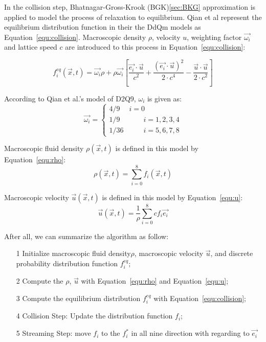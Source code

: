 In the collision step, Bhatnagar-Gross-Krook (BGK)\ref{sec:BKG} approximation is applied to model the process of relaxation to equilibrium. Qian et al represent the equilibrium distribution function in their the DdQm models as Equation~\ref{equ:collision}. Macroscopic density $\rho$, velocity $u$, weighting factor $\vec{\omega_i}$ and lattice speed $c$ are introduced to this process in Equation~\ref{equ:collision}:

\begin{equation}
\label{equ:collision}
    f_i^{eq}(\vec x, t) = \vec{\omega_i} \rho + \rho \vec{\omega_i} \left [  \frac{\vec{e_i}\cdot \vec u}{c^2} + \frac{(\vec{e_i}\cdot\vec u)^2 }{ 2 \cdot c^4 }-\frac{\vec u \cdot \vec u}{2 \cdot c^2} \right ]
\end{equation}

According to Qian et al.'s model of D2Q9, $\omega_i$ is given as:
\begin{equation}
    \vec{\omega_i} = \left\{\begin{matrix}
4/9 & i=0\\ 
1/9&\quad \quad i=1,2,3,4\\ 
1/36&\quad \quad i=5,6,7,8 
\end{matrix}\right.
\end{equation}

Macroscopic fluid density $\rho (\vec x, t)$ is defined in this model by Equation~\ref{equ:rho}:
\begin{equation}
\label{equ:rho}
    \rho (\vec x, t) = \sum_{i=0}^{8} f_i(\vec x,t)
\end{equation}

Macroscopic velocity $\vec u(\vec x, t)$ is defined in this model by Equation~\ref{equ:u}:
\begin{equation}
\label{equ:u}
    \vec u (\vec x, t) = \frac{1}{\rho} \sum_{i=0}^{8}cf_i\vec{e_i}
\end{equation}

After all, we can summarize the algorithm as follow:
\begin{itemize}
  \item [1] Initialize macroscopic fluid density$\rho$, macroscopic velocity $\vec u$, and discrete probability distribution function $f_i^{eq}$;
  \item [2] Compute the $\rho$, $\vec u$ with Equation~\ref{equ:rho} and Equation~\ref{equ:u};
  \item [3] Compute the equilibrium distribution $f^{eq}_i$ with Equation~\ref{equ:collision};
  \item [4] Collision Step: Update the distribution function $f_i$;
  \item [5] Streaming Step: move $f_i$ to the $f_i^*$ in all nine direction with regarding to $\vec{e_i}$
\end{itemize}


